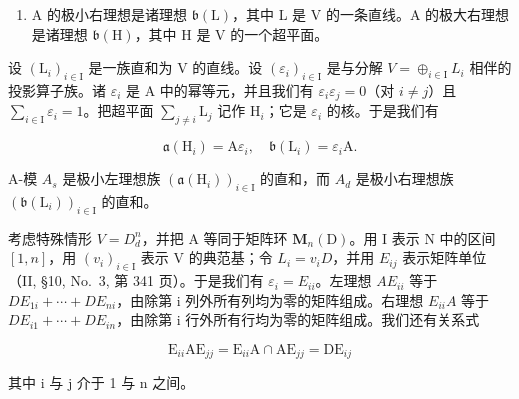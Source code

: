 \begin{enumerate}
\def\labelenumi{\alph{enumi})}
\setcounter{enumi}{1}
\tightlist
\item
  A 的极小右理想是诸理想 \(\mathfrak{b}(\mathrm{L})\)，其中 L 是 V 的一条直线。A 的极大右理想是诸理想 \(\mathfrak{b}(\mathrm{H})\)，其中 H 是 V 的一个超平面。
\end{enumerate}

设 \((\mathrm{L}_{i})_{i\in\mathrm{I}}\) 是一族直和为 V 的直线。设 \((\varepsilon_{i})_{i\in\mathrm{I}}\) 是与分解 \(V=\oplus_{i\in\mathrm{I}}L_{i}\) 相伴的投影算子族。诸 \(\varepsilon_{i}\) 是 A 中的幂等元，并且我们有 \(\varepsilon_{i}\varepsilon_{j} = 0\)（对 \(i\neq j\)）且 \(\sum_{i\in \mathrm{I}}\varepsilon_i = 1\)。把超平面 \(\sum_{j\neq i}\mathrm{L}_j\) 记作 \(\mathrm{H}_i\)；它是 \(\varepsilon_{i}\) 的核。于是我们有

\[
\mathfrak {a} (\mathrm{H} _ {i}) = \mathrm{A}   \varepsilon_ {i}  , \quad \mathfrak {b} (\mathrm{L} _ {i}) = \varepsilon_ {i}   \mathrm{A}  .
\]

A-模 \(A_{s}\) 是极小左理想族 \((\mathfrak{a}(\mathrm{H}_{i}))_{i\in\mathrm{I}}\) 的直和，而 \(A_{d}\) 是极小右理想族 \((\mathfrak{b}(\mathrm{L}_{i}))_{i\in\mathrm{I}}\) 的直和。

考虑特殊情形 \(V = D_{d}^{n}\)，并把 A 等同于矩阵环 \(\mathbf{M}_{n}(\mathrm{D})\)。用 I 表示 N 中的区间 \([1, n]\)，用 \((v_{i})_{i \in \mathrm{I}}\) 表示 V 的典范基；令 \(L_{i} = v_{i}D\)，并用 \(E_{ij}\) 表示矩阵单位（II, §10, No.~3, 第 341 页）。于是我们有 \(\varepsilon_{i} = E_{ii}\)。左理想 \(AE_{ii}\) 等于 \(DE_{1i} + \cdots + DE_{ni}\)，由除第 i 列外所有列均为零的矩阵组成。右理想 \(E_{ii}A\) 等于 \(DE_{i1} + \cdots + DE_{in}\)，由除第 i 行外所有行均为零的矩阵组成。我们还有关系式

\[
\mathrm{E} _ {i i} \mathrm{AE} _ {j j} = \mathrm{E} _ {i i} \mathrm{A} \cap \mathrm{AE} _ {j j} = \mathrm{DE} _ {i j}
\]

其中 i 与 j 介于 1 与 n 之间。
\relax{}
